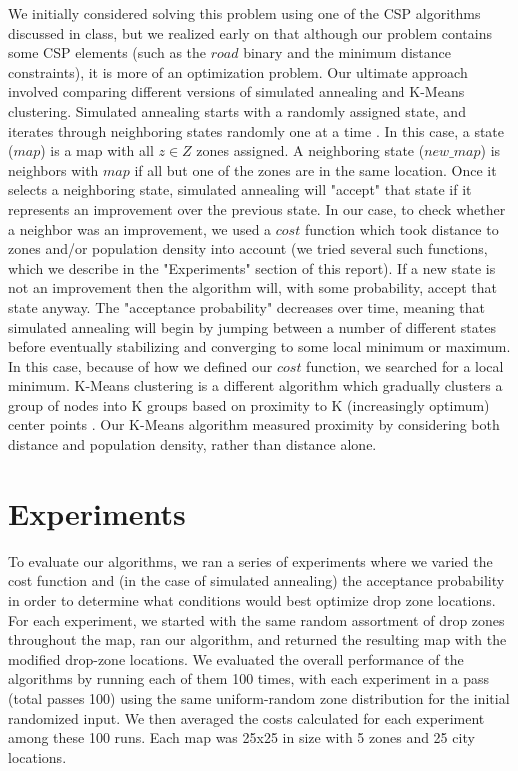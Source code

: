 \documentclass[11pt]{article}
\begin{document}
We initially considered solving this problem using one of the CSP algorithms discussed in class, but we realized early on that although our problem contains some CSP elements (such as the $road$ binary and the minimum distance constraints), it is more of an optimization problem. Our ultimate approach involved comparing different versions of simulated annealing and K-Means clustering. Simulated annealing starts with a randomly assigned state, and iterates through neighboring states randomly one at a time \cite{annealing}. In this case, a state ($map$) is a map with all $z \in Z$ zones assigned. A neighboring state ($new\_map$) is neighbors with $map$ if all but one of the zones are in the same location. Once it selects a neighboring state, simulated annealing will "accept" that state if it represents an improvement over the previous state. In our case, to check whether a neighbor was an improvement, we used a $cost$ function which took distance to zones and/or population density into account (we tried several such functions, which we describe in the "Experiments" section of this report). If a new state is not an improvement then the algorithm will, with some probability, accept that state anyway. The "acceptance probability" decreases over time, meaning that simulated annealing will begin by jumping between a number of different states before eventually stabilizing and converging to some local minimum or maximum. In this case, because of how we defined our $cost$ function, we searched for a local minimum. K-Means clustering is a different algorithm which gradually clusters a group of nodes into K groups based on proximity to K (increasingly optimum) center points \cite{textbook}. Our K-Means algorithm measured proximity by considering both distance and population density, rather than distance alone.

\section{Experiments}

To evaluate our algorithms, we ran a series of experiments where we varied the cost function and (in the case of simulated annealing) the acceptance probability in order to determine what conditions would best optimize drop zone locations. For each experiment, we started with the same random assortment of drop zones throughout the map, ran our algorithm, and returned the resulting map with the modified drop-zone locations. We evaluated the overall performance of the algorithms by running each of them 100 times, with each experiment in a pass (total passes 100) using the same uniform-random zone distribution for the initial randomized input. We then averaged the costs calculated for each experiment among these 100 runs. Each map was 25x25 in size with 5 zones and 25 city locations.
\end{document}
